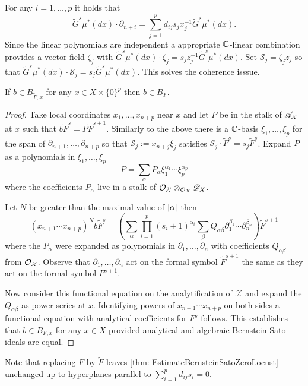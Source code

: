 For any $i=1,\ldots,p$ it holds that
$$\widetilde{G}^s \mu^*(dx)\cdot \partial_{n+i} = \sum_{j=1}^p d_{ij}s_j x_j^{-1} \widetilde{G}^s \mu^*(dx).$$
Since the linear polynomials are independent a appropriate $\mathbb{C}$-linear combination provides a vector field $\zeta_j$ with $\widetilde{G}^s \mu^*(dx)\cdot \zeta_j = s_{j}z_j^{-1}\widetilde{G}^s \mu^*(dx)$.
Set $\mathcal{S}_j = \zeta_jz_j$ so that $\widetilde{G}^s \mu^*(dx) \cdot \mathcal{S}_j = s_j \widetilde{G}^s \mu^*(dx) $.
This solves the coherence isssue.
\begin{lemma}\label{lem: ReplacementIsAllowed}
  If $b\in B_{\widetilde{F},x}$ for any $x\in X\times \{0\}^p$ then $b \in B_F$.
\end{lemma}
\begin{proof}
  Take local coordinates $x_1,\ldots, x_{n+p}$ near $x$ and let $P$ be in the stalk of $\mathscr{A}_{\mathcal{X}}$ at $x$ such that $b \widetilde{F}^s = P \widetilde{F}^{s+1}$.
  Similarly to the above there is a $\mathbb{C}$-basis $\xi_1,\ldots,\xi_p$ for the span of $\partial_{n+1}, \ldots, \partial_{n+p}$ so that $\mathcal{S}_j := x_{n+j}\xi_j$ satisfies $\mathcal{S}_j \cdot \widetilde{F}^s = s_{j}\widetilde{F}^s$.
  Expand $P$ as a polynomials in $\xi_1,\ldots,\xi_p$
  $$P = \sum_{\alpha} P_\alpha \xi_{1}^{\alpha_1}\cdots \xi_{p}^{\alpha_p}$$
  where the coefficients $P_\alpha$ live in a stalk of $\mathcal{O}_{\mathcal{X}}\otimes_{\mathcal{O}_X}\mathscr{D}_X$.

  Let $N$ be greater than the maximal value of $\vert \alpha \vert$ then
  $$(x_{n+1}\cdots x_{n+p})^N b \widetilde{F}^s = \left(\sum_{\alpha} \prod_{i=1}^p (s_i + 1)^{\alpha_i} \sum_\beta Q_{\alpha\beta} \partial_1^{\beta_1}\cdots \partial_n^{\beta_n} \right)\widetilde{F}^{s+1}$$
  where the $P_\alpha$ were expanded as polynomials in $\partial_1,\ldots,\partial_n$ with coefficients $Q_{\alpha\beta}$ from $\mathcal{O}_{\mathcal{X}}$.
  Observe that $\partial_1,\ldots, \partial_n$ act on the formal symbol $\widetilde{F}^{s+1}$ the same as they act on the formal symbol $F^{s+1}$.

  Now consider this functional equation on the analytification of $\mathcal{X}$ and expand the $Q_{\alpha\beta}$ as power series at $x$.
  Identifying powers of $x_{n+1}\cdots x_{n+p}$ on both sides a functional equation with analytical coefficients for $F^s$ follows.
  This establishes that $b \in B_{F,x}$ for any $x\in X$ provided analytical and algebraic Bernstein-Sato ideals are equal.
\end{proof}
Note that replacing $F$ by $\widetilde{F}$ leaves \cref{thm: EstimateBernsteinSatoZeroLocust} unchanged up to hyperplanes parallel to $\sum_{i=1}^p d_{ij}s_i = 0$.
